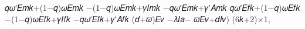 𝑞𝜔′𝐸𝑚𝑘+(1−𝑞)𝜔𝐸𝑚𝑘
−(1−𝑞)𝜔𝐸𝑚𝑘+𝛾𝐼𝑚𝑘
−𝑞𝜔′𝐸𝑚𝑘+𝛾′𝐴𝑚𝑘
𝑞𝜔′𝐸𝑓𝑘+(1−𝑞)𝜔𝐸𝑓𝑘
−(1−𝑞)𝜔𝐸𝑓𝑘+𝛾𝐼𝑓𝑘
−𝑞𝜔′𝐸𝑓𝑘+𝛾′𝐴𝑓𝑘
(𝑑+𝜛)𝐸𝑣
−𝜆𝐼𝑎− 𝜛𝐸𝑣+𝑑𝐼𝑣)
(6𝑘+2)×1,
